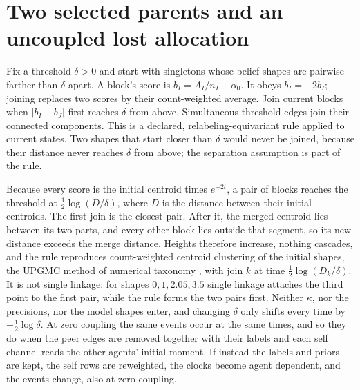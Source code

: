 \section{Two selected parents and an uncoupled lost allocation}
\label{cf:selection}

Fix a threshold $\delta>0$ and start with singletons whose belief shapes are pairwise farther than $\delta$ apart. A block's score is $b_I=A_I/n_I-\alpha_0$. It obeys $\dot b_I=-2b_I$; joining replaces two scores by their count-weighted average. Join current blocks when $|b_I-b_J|$ first reaches $\delta$ from above. Simultaneous threshold edges join their connected components. This is a declared, relabeling-equivariant rule applied to current states. Two shapes that start closer than $\delta$ would never be joined, because their distance never reaches $\delta$ from above; the separation assumption is part of the rule.

Because every score is the initial centroid times $e^{-2t}$, a pair of blocks reaches the threshold at $\tfrac12\log(D/\delta)$, where $D$ is the distance between their initial centroids. The first join is the closest pair. After it, the merged centroid lies between its two parts, and every other block lies outside that segment, so its new distance exceeds the merge distance. Heights therefore increase, nothing cascades, and the rule reproduces count-weighted centroid clustering of the initial shapes, the UPGMC method of numerical taxonomy \citep{SokalMichener1958,LanceWilliams1967}, with join $k$ at time $\tfrac12\log(D_k/\delta)$. It is not single linkage: for shapes $0,1,2.05,3.5$ single linkage attaches the third point to the first pair, while the rule forms the two pairs first. Neither $\kappa$, nor the precisions, nor the model shapes enter, and changing $\delta$ only shifts every time by $-\tfrac12\log\delta$. At zero coupling the same events occur at the same times, and so they do when the peer edges are removed together with their labels and each self channel reads the other agents' initial moment. If instead the labels and priors are kept, the self rows are reweighted, the clocks become agent dependent, and the events change, also at zero coupling.

